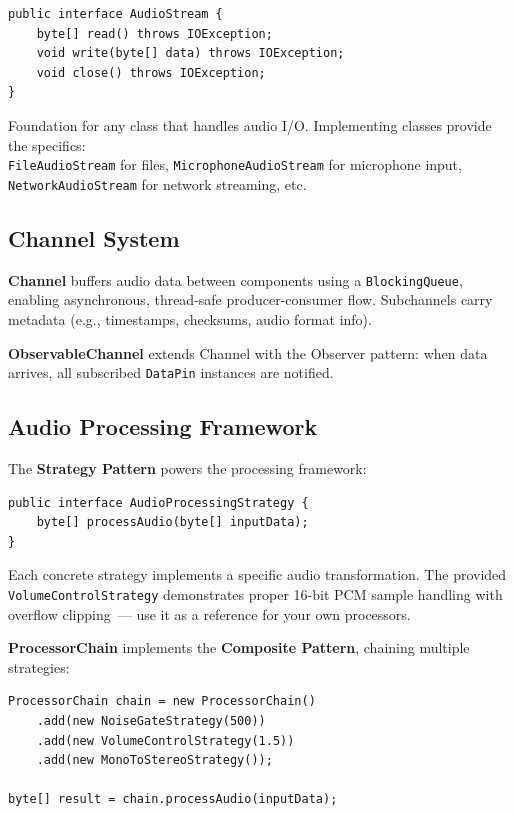 \documentclass[a4paper,12pt]{article}
\begin{document}
\begin{lstlisting}
public interface AudioStream {
    byte[] read() throws IOException;
    void write(byte[] data) throws IOException;
    void close() throws IOException;
}
\end{lstlisting}

Foundation for any class that handles audio I/O. Implementing classes provide
the specifics: \\
\texttt{FileAudioStream} for files, \texttt{MicrophoneAudioStream}
for microphone input, \texttt{NetworkAudioStream} for network streaming, etc.

\subsection{Channel System}

\textbf{Channel} buffers audio data between components using a \texttt{BlockingQueue},
enabling asynchronous, thread-safe producer-consumer flow.
Subchannels carry metadata (e.g., timestamps, checksums, audio format info).

\textbf{ObservableChannel} extends Channel with the Observer pattern:
when data arrives, all subscribed \texttt{DataPin} instances are notified.

\subsection{Audio Processing Framework}

The \textbf{Strategy Pattern} powers the processing framework:

\begin{lstlisting}
public interface AudioProcessingStrategy {
    byte[] processAudio(byte[] inputData);
}
\end{lstlisting}

Each concrete strategy implements a specific audio transformation.
The provided \texttt{VolumeControlStrategy} demonstrates proper 16-bit PCM sample handling
with overflow clipping~--- use it as a reference for your own processors.

\textbf{ProcessorChain} implements the \textbf{Composite Pattern}, chaining multiple strategies:

\begin{lstlisting}
ProcessorChain chain = new ProcessorChain()
    .add(new NoiseGateStrategy(500))
    .add(new VolumeControlStrategy(1.5))
    .add(new MonoToStereoStrategy());

byte[] result = chain.processAudio(inputData);
\end{lstlisting}
\end{document}
